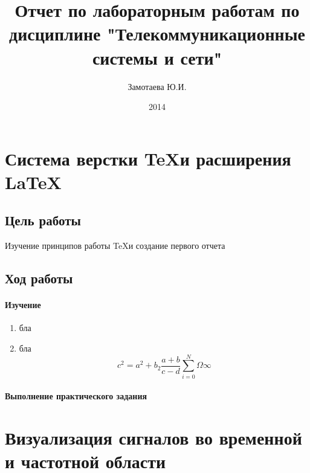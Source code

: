 \documentclass[10pt,a4paper]{article}
\author{Замотаева Ю.И.}
\title{Отчет по лабораторным работам по дисциплине "Телекоммуникационные системы и сети"}
\date{2014}
\begin{document}
\maketitle
\tableofcontents
\pagebreak
\section{Система верстки \TeX и расширения \LaTeX}
\subsection{Цель работы}
Изучение принципов работы \TeX и создание первого отчета
\subsection{Ход работы}
\paragraph{Изучение}
\begin{enumerate}
\item бла
\item бла
\begin{equation}
c^2=a^2+b_2\frac{a+b}{c-d}
\sum_{i=0}^{N} \Omega \infty
\end{equation}
\end{enumerate}
\paragraph{Выполнение практического задания}
\section{Визуализация сигналов во временной и частотной области}
\end{document}
